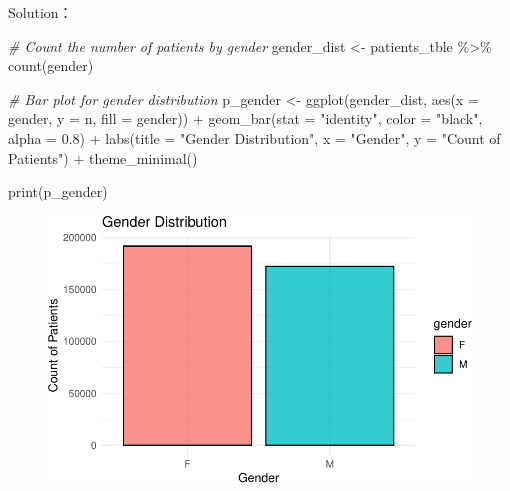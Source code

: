 \documentclass[
]{article}
\newenvironment{Shaded}{\begin{snugshade}}{\end{snugshade}}
\newcommand{\AttributeTok}[1]{\textcolor[rgb]{0.77,0.63,0.00}{#1}}
\newcommand{\CommentTok}[1]{\textcolor[rgb]{0.56,0.35,0.01}{\textit{#1}}}
\newcommand{\FloatTok}[1]{\textcolor[rgb]{0.00,0.00,0.81}{#1}}
\newcommand{\FunctionTok}[1]{\textcolor[rgb]{0.00,0.00,0.00}{#1}}
\newcommand{\NormalTok}[1]{\textcolor[rgb]{0.00,0.00,0.00}{#1}}
\newcommand{\OtherTok}[1]{\textcolor[rgb]{0.56,0.35,0.01}{#1}}
\newcommand{\SpecialCharTok}[1]{\textcolor[rgb]{0.00,0.00,0.00}{#1}}
\newcommand{\StringTok}[1]{\textcolor[rgb]{0.31,0.60,0.02}{#1}}
\begin{document}
Solution：

\begin{Shaded}
\begin{Highlighting}[]
\CommentTok{\# Count the number of patients by gender}
\NormalTok{gender\_dist }\OtherTok{\textless{}{-}}\NormalTok{ patients\_tble }\SpecialCharTok{\%\textgreater{}\%}
  \FunctionTok{count}\NormalTok{(gender)}

\CommentTok{\# Bar plot for gender distribution}
\NormalTok{p\_gender }\OtherTok{\textless{}{-}} \FunctionTok{ggplot}\NormalTok{(gender\_dist, }\FunctionTok{aes}\NormalTok{(}\AttributeTok{x =}\NormalTok{ gender, }\AttributeTok{y =}\NormalTok{ n, }\AttributeTok{fill =}\NormalTok{ gender)) }\SpecialCharTok{+}
  \FunctionTok{geom\_bar}\NormalTok{(}\AttributeTok{stat =} \StringTok{"identity"}\NormalTok{, }\AttributeTok{color =} \StringTok{"black"}\NormalTok{, }\AttributeTok{alpha =} \FloatTok{0.8}\NormalTok{) }\SpecialCharTok{+}
  \FunctionTok{labs}\NormalTok{(}\AttributeTok{title =} \StringTok{"Gender Distribution"}\NormalTok{,}
       \AttributeTok{x =} \StringTok{"Gender"}\NormalTok{,}
       \AttributeTok{y =} \StringTok{"Count of Patients"}\NormalTok{) }\SpecialCharTok{+}
  \FunctionTok{theme\_minimal}\NormalTok{()}


\FunctionTok{print}\NormalTok{(p\_gender)}
\end{Highlighting}
\end{Shaded}

\begin{figure}[H]

{\centering \includegraphics{hw3_files/figure-pdf/unnamed-chunk-29-1.pdf}

}

\end{figure}
\end{document}
